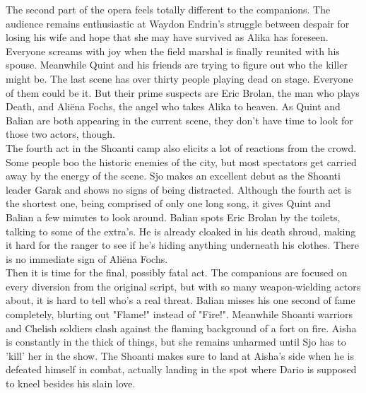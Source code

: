 The second part of the opera feels totally different to the companions. The audience remains enthusiastic at Waydon Endrin's struggle between despair for losing his wife and hope that she may have survived as Alika has foreseen. Everyone screams with joy when the field marshal is finally reunited with his spouse. Meanwhile Quint and his friends are trying to figure out who the killer might be. The last scene has over thirty people playing dead on stage. Everyone of them could be it. But their prime suspects are Eric Brolan, the man who plays Death, and Ali\"ena Fochs, the angel who takes Alika to heaven. As Quint and Balian are both appearing in the current scene, they don't have time to look for those two actors, though.\\

The fourth act in the Shoanti camp also elicits a lot of reactions from the crowd. Some people boo the historic enemies of the city, but most spectators get carried away by the energy of the scene. Sjo makes an excellent debut as the Shoanti leader Garak and shows no signs of being distracted. Although the fourth act is the shortest one, being comprised of only one long song, it gives Quint and Balian a few minutes to look around. Balian spots Eric Brolan by the toilets, talking to some of the extra's. He is already cloaked in his death shroud, making it hard for the ranger to see if he's hiding anything underneath his clothes. There is no immediate sign of Ali\"ena Fochs.\\

Then it is time for the final, possibly fatal act. The companions are focused on every diversion from the original script, but with so many weapon-wielding actors about, it is hard to tell who's a real threat. Balian misses his one second of fame completely, blurting out "Flame!" instead of "Fire!". Meanwhile Shoanti warriors and Chelish soldiers clash against the flaming background of a fort on fire. Aisha is constantly in the thick of things, but she remains unharmed until Sjo has to 'kill' her in the show. The Shoanti makes sure to land at Aisha's side when he is defeated himself in combat, actually landing in the spot where Dario is supposed to kneel besides his slain love.\\

